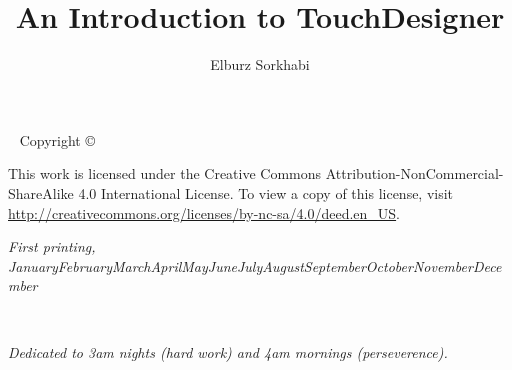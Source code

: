 \documentclass[notoc]{tufte-book} %
\title{An Introduction to TouchDesigner} %
\author{Elburz Sorkhabi} %
\newcommand{\monthyear}{\ifcase\month\or January\or February\or March\or April\or May\or June\or July\or August\or September\or October\or November\or December\fi\space\number\year} %
\begin{document}
\frontmatter



\maketitle %


\newpage
\begin{fullwidth}
~\vfill
\thispagestyle{empty}
\setlength{\parindent}{0pt}
\setlength{\parskip}{\baselineskip}
Copyright \copyright\ \the\year\ \thanklessauthor

\par{}

\par{}

\par This work is licensed under the Creative Commons Attribution-NonCommercial-ShareAlike 4.0 International License. To view a copy of this license, visit \url{http://creativecommons.org/licenses/by-nc-sa/4.0/deed.en_US}.

\par\textit{First printing, \monthyear}
\end{fullwidth}


\tableofcontents %



\cleardoublepage
~\vfill
\begin{doublespace}
\noindent\fontsize{18}{22}\selectfont\itshape
\nohyphenation
Dedicated to 3am nights (hard work) and 4am mornings (perseverence).
\end{doublespace}
\vfill
\vfill

\end{document}
